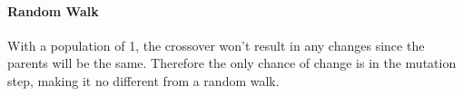 \documentclass[12pt]{article}
\begin{document}
\begin{enumerate}
\begin{enumerate}
  \paragraph{Random Walk} With a population of 1, the crossover won't result in any changes since the parents will be the same. Therefore the only chance of change is in the mutation step, making it no different from a random walk.

  \end{enumerate}
\newpage

\end{enumerate}
\end{document}
